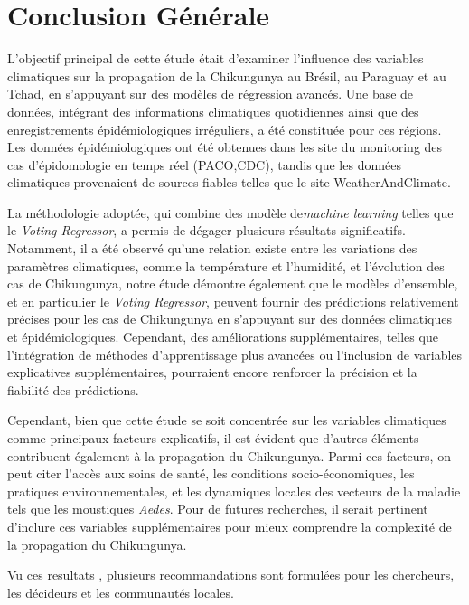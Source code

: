 \chapter*{Conclusion Générale}

L'objectif principal de cette étude était d'examiner l'influence des variables climatiques sur la propagation de la Chikungunya au Brésil, au Paraguay et au Tchad, en s'appuyant sur des modèles de régression avancés. Une base de données, intégrant des informations climatiques quotidiennes ainsi que des enregistrements épidémiologiques irréguliers, a été constituée pour ces régions. Les données épidémiologiques ont été obtenues dans les site du monitoring des cas d'épidomologie en temps réel (PACO,CDC), tandis que les données climatiques provenaient de sources fiables telles que le site WeatherAndClimate.

La méthodologie adoptée, qui combine des modèle de\textit{machine learning} telles que le \textit{Voting Regressor}, a permis de dégager plusieurs résultats significatifs. Notamment, il a été observé qu'une relation existe entre les variations des paramètres climatiques, comme la température et l'humidité, et l'évolution des cas de Chikungunya, notre étude démontre également que le modèles d'ensemble, et en particulier le \textit{Voting Regressor}, peuvent fournir des prédictions relativement précises pour les cas de Chikungunya en s'appuyant sur des données climatiques et épidémiologiques. Cependant, des améliorations supplémentaires, telles que l'intégration de méthodes d'apprentissage plus avancées ou l'inclusion de variables explicatives supplémentaires, pourraient encore renforcer la précision et la fiabilité des prédictions.

Cependant, bien que cette étude se soit concentrée sur les variables climatiques comme principaux facteurs explicatifs, il est évident que d'autres éléments contribuent également à la propagation du Chikungunya. Parmi ces facteurs, on peut citer l'accès aux soins de santé, les conditions socio-économiques, les pratiques environnementales, et les dynamiques locales des vecteurs de la maladie tels que les moustiques \textit{Aedes}. Pour de futures recherches, il serait pertinent d'inclure ces variables supplémentaires pour mieux comprendre la complexité de la propagation du Chikungunya.

Vu ces resultats , plusieurs recommandations sont formulées pour les chercheurs, les décideurs et les communautés locales.


